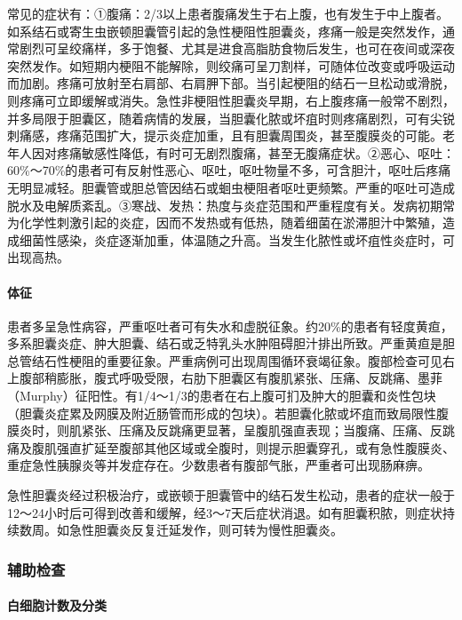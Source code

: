 常见的症状有：①腹痛：2/3以上患者腹痛发生于右上腹，也有发生于中上腹者。如系结石或寄生虫嵌顿胆囊管引起的急性梗阻性胆囊炎，疼痛一般是突然发作，通常剧烈可呈绞痛样，多于饱餐、尤其是进食高脂肪食物后发生，也可在夜间或深夜突然发作。如短期内梗阻不能解除，则绞痛可呈刀割样，可随体位改变或呼吸运动而加剧。疼痛可放射至右肩部、右肩胛下部。当引起梗阻的结石一旦松动或滑脱，则疼痛可立即缓解或消失。急性非梗阻性胆囊炎早期，右上腹疼痛一般常不剧烈，并多局限于胆囊区，随着病情的发展，当胆囊化脓或坏疽时则疼痛剧烈，可有尖锐刺痛感，疼痛范围扩大，提示炎症加重，且有胆囊周围炎，甚至腹膜炎的可能。老年人因对疼痛敏感性降低，有时可无剧烈腹痛，甚至无腹痛症状。②恶心、呕吐：60\%～70\%的患者可有反射性恶心、呕吐，呕吐物量不多，可含胆汁，呕吐后疼痛无明显减轻。胆囊管或胆总管因结石或蛔虫梗阻者呕吐更频繁。严重的呕吐可造成脱水及电解质紊乱。③寒战、发热：热度与炎症范围和严重程度有关。发病初期常为化学性刺激引起的炎症，因而不发热或有低热，随着细菌在淤滞胆汁中繁殖，造成细菌性感染，炎症逐渐加重，体温随之升高。当发生化脓性或坏疽性炎症时，可出现高热。

\paragraph{体征}

患者多呈急性病容，严重呕吐者可有失水和虚脱征象。约20\%的患者有轻度黄疸，多系胆囊炎症、肿大胆囊、结石或乏特乳头水肿阻碍胆汁排出所致。严重黄疸是胆总管结石性梗阻的重要征象。严重病例可出现周围循环衰竭征象。腹部检查可见右上腹部稍膨胀，腹式呼吸受限，右肋下胆囊区有腹肌紧张、压痛、反跳痛、墨菲（Murphy）征阳性。有1/4～1/3的患者在右上腹可扪及肿大的胆囊和炎性包块（胆囊炎症累及网膜及附近肠管而形成的包块）。若胆囊化脓或坏疽而致局限性腹膜炎时，则肌紧张、压痛及反跳痛更显著，呈腹肌强直表现；当腹痛、压痛、反跳痛及腹肌强直扩延至腹部其他区域或全腹时，则提示胆囊穿孔，或有急性腹膜炎、重症急性胰腺炎等并发症存在。少数患者有腹部气胀，严重者可出现肠麻痹。

急性胆囊炎经过积极治疗，或嵌顿于胆囊管中的结石发生松动，患者的症状一般于12～24小时后可得到改善和缓解，经3～7天后症状消退。如有胆囊积脓，则症状持续数周。如急性胆囊炎反复迁延发作，则可转为慢性胆囊炎。

\subsubsection{辅助检查}

\paragraph{白细胞计数及分类}

